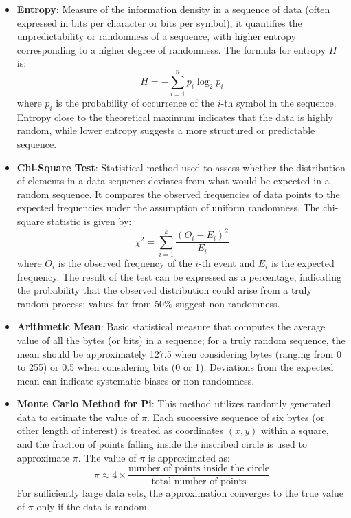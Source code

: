 \documentclass[prl,twocolumn]{revtex4-1}
\begin{document}
\begin{itemize}
    \item \textbf{Entropy}: Measure of the information density in a sequence of data (often expressed in bits per character or bits per symbol), it quantifies the unpredictability or randomness of a sequence, with higher entropy corresponding to a higher degree of randomness. The formula for entropy $H$ is:
    \begin{equation}
        H = -\sum_{i=1}^{n} p_i \log_2 p_i
    \end{equation}
    where $p_i$ is the probability of occurrence of the $i$-th symbol in the sequence. Entropy close to the theoretical maximum indicates that the data is highly random, while lower entropy suggests a more structured or predictable sequence.

    \item \textbf{Chi-Square Test}: Statistical method used to assess whether the distribution of elements in a data sequence deviates from what would be expected in a random sequence. It compares the observed frequencies of data points to the expected frequencies under the assumption of uniform randomness. The chi-square statistic is given by:
    \begin{equation}
        \chi^2 = \sum_{i=1}^{k} \frac{(O_i - E_i)^2}{E_i}
    \end{equation}
    where $O_i$ is the observed frequency of the $i$-th event and $E_i$ is the expected frequency. The result of the test can be expressed as a percentage, indicating the probability that the observed distribution could arise from a truly random process: values far from 50\% suggest non-randomness.

    \item \textbf{Arithmetic Mean}: Basic statistical measure that computes the average value of all the bytes (or bits) in a sequence; for a truly random sequence, the mean should be approximately 127.5 when considering bytes (ranging from 0 to 255) or 0.5 when considering bits (0 or 1). Deviations from the expected mean can indicate systematic biases or non-randomness.

    \item \textbf{Monte Carlo Method for Pi}: This method utilizes randomly generated data to estimate the value of $\pi$. Each successive sequence of six bytes (or other length of interest) is treated as coordinates $(x, y)$ within a square, and the fraction of points falling inside the inscribed circle is used to approximate $\pi$. The value of $\pi$ is approximated as:
    \begin{equation}
        \pi \approx 4 \times \frac{\text{number of points inside the circle}}{\text{total number of points}}
    \end{equation}
    For sufficiently large data sets, the approximation converges to the true value of $\pi$ only if the data is random.


\end{itemize}
\end{document}

